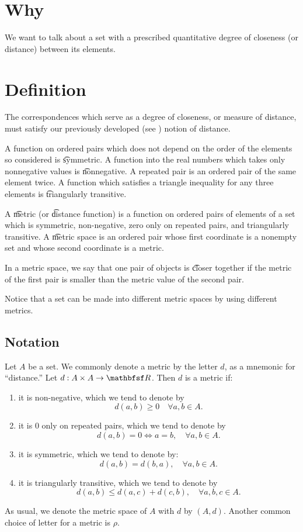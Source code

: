 
\section*{Why}

We want to talk about a set with a prescribed quantitative degree of closeness (or distance) between its elements.

\section*{Definition}

The correspondences which serve as a degree of closeness, or measure of distance, must satisfy our previously developed (see ) notion of distance.

A function on ordered pairs which does not depend on the order of the elements so considered is \t{symmetric}.
A function into the real numbers which takes only nonnegative values is \t{nonnegative}.
A repeated pair is an ordered pair of the same element twice.
A function which satisfies a triangle inequality for any three elements is \t{triangularly transitive}.

A \t{metric} (or \t{distance function}) is a function on ordered pairs of elements of a set which is symmetric, non-negative, zero only on repeated pairs, and triangularly transitive.
A \t{metric space} is an ordered pair whose first coordinate is a nonempty set and whose second coordinate is a metric.

In a metric space, we say that one pair of objects is \t{closer} together if the metric of the first pair is smaller than the metric value of the second pair.

Notice that a set can be made into different metric spaces by using different metrics.

\subsection*{Notation}

Let $A$ be a set.
We commonly denote a metric by the letter $d$, as a mnemonic for ``distance.''
Let $d: A \times  A \to \R $.
Then $d$ is a metric if:
    \begin{enumerate}
      \item it is non-negative, which we tend to denote by
\[
d(a, b) \geq 0 \quad \forall a,b \in A.
\]
      \item it is $0$ only on repeated pairs, which we tend to denote by
\[
d(a, b) = 0 \iff a = b, \quad \forall a,b \in A.
\]
      \item it is symmetric, which we tend to denote by:
\[
d(a, b) = d(b, a), \quad \forall a,b \in A.
\]
      \item it is triangularly transitive, which we tend to denote by
\[
d(a, b) \leq d(a, c) + d(c, b), \quad \forall a,b,c \in A.
\]
    \end{enumerate}
As usual, we denote the metric space of $A$ with $d$ by $(A, d)$.
Another common choice of letter for a metric is $\rho $.


